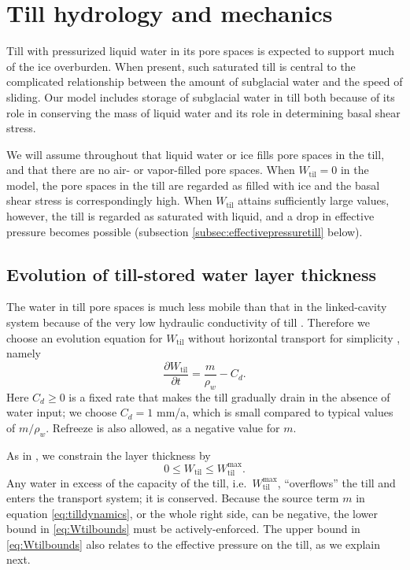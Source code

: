 \documentclass[gmd]{copernicus}   %
\begin{document}
\section{Till hydrology and mechanics} \label{sec:tillmechanics}

Till with pressurized liquid water in its pore spaces is expected to support much of the ice overburden.  When present, such saturated till is central to the complicated relationship between the amount of subglacial water and the speed of sliding.  Our model includes storage of subglacial water in till both because of its role in conserving the mass of liquid water and its role in determining basal shear stress.

We will assume throughout that liquid water or ice fills pore spaces in the till, and that there are no air- or vapor-filled pore spaces.  When $W_{\text{til}}=0$ in the model, the pore spaces in the till are regarded as filled with ice and the basal shear stress is correspondingly high.  When $W_{\text{til}}$ attains sufficiently large values, however, the till is regarded as saturated with liquid, and a drop in effective pressure becomes possible (subsection \ref{subsec:effectivepressuretill} below).

\subsection{Evolution of till-stored water layer thickness}  The water in till pore spaces is much less mobile than that in the linked-cavity system because of the very low hydraulic conductivity of till \citep{LingleBrown1987,TrufferEchelmeyerHarrison2001}.  Therefore we choose an evolution equation for $W_{\text{til}}$ without horizontal transport for simplicity \citep{BBssasliding,Tulaczyketal2000}, namely
\begin{equation}
\frac{\partial W_{\text{til}}}{\partial t} = \frac{m}{\rho_w} - C_d. \label{eq:tilldynamics}
\end{equation}
Here $C_d\ge 0$ is a fixed rate that makes the till gradually drain in the absence of water input; we choose $C_d=1$ mm/a, which is small compared to typical values of $m/\rho_w$.  Refreeze is also allowed, as a negative value for $m$.

As in \citep{BBssasliding}, we constrain the layer thickness by
\begin{equation}
0 \le W_{\text{til}} \le W_{\text{til}}^{\text{max}}.  \label{eq:Wtilbounds}
\end{equation}
Any water in excess of the capacity of the till, i.e.~$W_{\text{til}}^{\text{max}}$, ``overflows'' the till and enters the transport system; it is conserved.  Because the source term $m$ in equation \eqref{eq:tilldynamics}, or the whole right side, can be negative, the lower bound in \eqref{eq:Wtilbounds} must be actively-enforced.  The upper bound in \eqref{eq:Wtilbounds} also relates to the effective pressure on the till, as we explain next.
\end{document}
